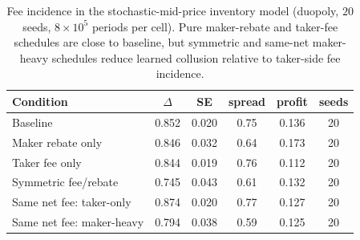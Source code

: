 \begin{table}[t]
\centering
\caption{Fee incidence in the stochastic-mid-price inventory model (duopoly, $20$ seeds, $8\times10^5$ periods per cell). Pure maker-rebate and taker-fee schedules are close to baseline, but symmetric and same-net maker-heavy schedules reduce learned collusion relative to taker-side fee incidence.}
\label{tab:inventory-fee}
\small
\begin{tabular}{@{}lccccc@{}}
\toprule
Condition & $\Delta$ & SE & spread & profit & seeds \\
\midrule
Baseline & 0.852 & 0.020 & 0.75 & 0.136 & 20 \\
Maker rebate only & 0.846 & 0.032 & 0.64 & 0.173 & 20 \\
Taker fee only & 0.844 & 0.019 & 0.76 & 0.112 & 20 \\
Symmetric fee/rebate & 0.745 & 0.043 & 0.61 & 0.132 & 20 \\
Same net fee: taker-only & 0.874 & 0.020 & 0.77 & 0.127 & 20 \\
Same net fee: maker-heavy & 0.794 & 0.038 & 0.59 & 0.125 & 20 \\
\bottomrule
\end{tabular}
\end{table}
